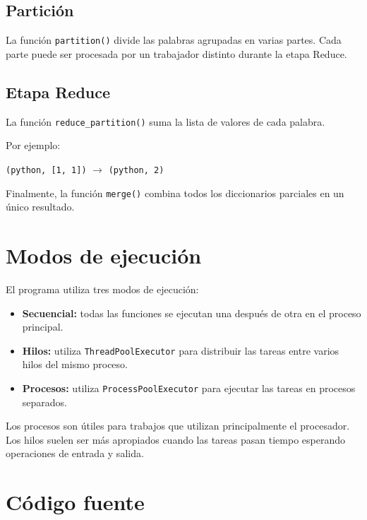 \subsection{Partición}

La función \texttt{partition()} divide las palabras agrupadas en varias
partes. Cada parte puede ser procesada por un trabajador distinto durante
la etapa Reduce.

\subsection{Etapa Reduce}

La función \texttt{reduce\_partition()} suma la lista de valores de cada
palabra.

Por ejemplo:

\begin{center}
\texttt{(python, [1, 1])} $\longrightarrow$ \texttt{(python, 2)}
\end{center}

Finalmente, la función \texttt{merge()} combina todos los diccionarios
parciales en un único resultado.

\section{Modos de ejecución}

El programa utiliza tres modos de ejecución:

\begin{itemize}
    \item \textbf{Secuencial:} todas las funciones se ejecutan una después de
    otra en el proceso principal.

    \item \textbf{Hilos:} utiliza \texttt{ThreadPoolExecutor} para distribuir
    las tareas entre varios hilos del mismo proceso.

    \item \textbf{Procesos:} utiliza \texttt{ProcessPoolExecutor} para ejecutar
    las tareas en procesos separados.
\end{itemize}

Los procesos son útiles para trabajos que utilizan principalmente el
procesador. Los hilos suelen ser más apropiados cuando las tareas pasan
tiempo esperando operaciones de entrada y salida.

\section{Código fuente}

